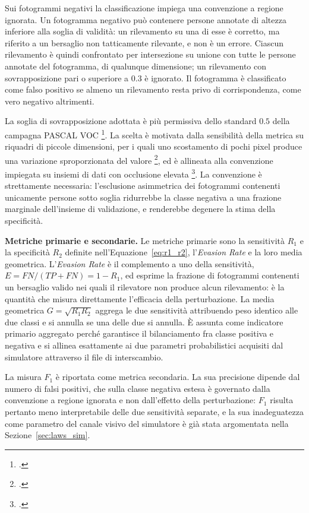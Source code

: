 \ifstampa\documentclass[a4paper,12pt,twoside,openright]{report}\else\documentclass[a4paper,12pt]{report}\fi
\begin{document}
Sui fotogrammi negativi la classificazione impiega una convenzione a regione
ignorata. Un fotogramma negativo può contenere persone annotate di altezza
inferiore alla soglia di validità: un rilevamento su una di esse è corretto, ma
riferito a un bersaglio non tatticamente rilevante, e non è un errore.
Ciascun rilevamento è quindi confrontato per intersezione su unione con tutte le
persone annotate del fotogramma, di qualunque dimensione; un rilevamento con
sovrapposizione pari o superiore a $0.3$ è ignorato. Il fotogramma è classificato
come falso positivo se almeno un rilevamento resta privo di corrispondenza, come
vero negativo altrimenti.

La soglia di sovrapposizione adottata è più permissiva dello standard $0.5$
della campagna PASCAL VOC \footcite{everingham_2010_voc}. La scelta è motivata
dalla sensibilità della metrica su riquadri di piccole dimensioni, per i quali
uno scostamento di pochi pixel produce una variazione sproporzionata del valore
\footcite{yu_2020_scalematch}, ed è allineata alla convenzione impiegata su
insiemi di dati con occlusione elevata \footcite{shao_2018_crowdhuman}. La
convenzione è strettamente necessaria: l'esclusione asimmetrica dei fotogrammi
contenenti unicamente persone sotto soglia ridurrebbe la classe negativa a una
frazione marginale dell'insieme di validazione, e renderebbe degenere la stima
della specificità.

\textbf{Metriche primarie e secondarie.}
\label{sec:metriche_scelta}
Le metriche primarie sono la sensitività $R_1$ e la specificità $R_2$ definite
nell'Equazione~\ref{eq:r1_r2}, l'\textit{Evasion Rate} e la loro media
geometrica. L'\textit{Evasion Rate} è il complemento a uno della sensitività,
$E = \mathit{FN} / (\mathit{TP} + \mathit{FN}) = 1 - R_1$, ed esprime la frazione
di fotogrammi contenenti un bersaglio valido nei quali il rilevatore non produce
alcun rilevamento: è la quantità che misura direttamente l'efficacia della
perturbazione. La media geometrica $G = \sqrt{R_1 R_2}$ aggrega le due
sensitività attribuendo peso identico alle due classi e si annulla se una delle
due si annulla. È assunta come indicatore primario aggregato perché garantisce il
bilanciamento fra classe positiva e negativa e si allinea esattamente ai due
parametri probabilistici acquisiti dal simulatore attraverso il file di
interscambio.

La misura $F_1$ è riportata come metrica secondaria. La sua precisione dipende
dal numero di falsi positivi, che sulla classe negativa estesa è governato dalla
convenzione a regione ignorata e non dall'effetto della perturbazione: $F_1$
risulta pertanto meno interpretabile delle due sensitività separate, e la sua
inadeguatezza come parametro del canale visivo del simulatore è già stata
argomentata nella Sezione~\ref{sec:laws_sim}.
\end{document}
